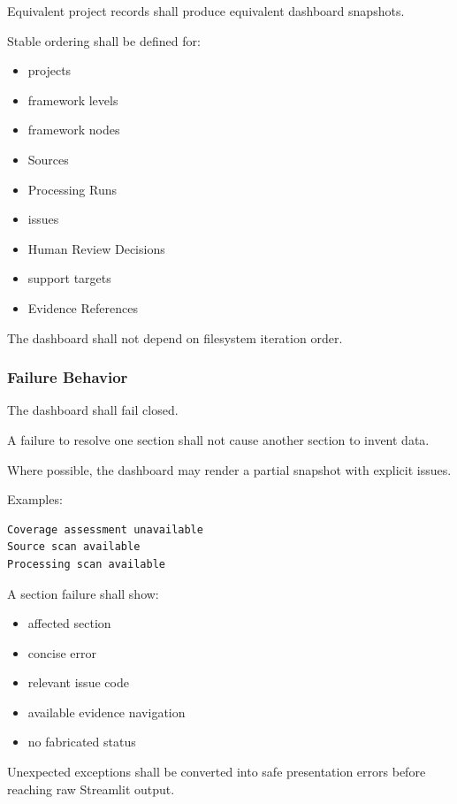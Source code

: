 Equivalent project records shall produce equivalent dashboard snapshots.

Stable ordering shall be defined for:

\begin{itemize}
\tightlist
\item
  projects
\item
  framework levels
\item
  framework nodes
\item
  Sources
\item
  Processing Runs
\item
  issues
\item
  Human Review Decisions
\item
  support targets
\item
  Evidence References
\end{itemize}

The dashboard shall not depend on filesystem iteration order.

\hypertarget{failure-behavior}{%
\subsubsection{Failure Behavior}\label{failure-behavior}}

The dashboard shall fail closed.

A failure to resolve one section shall not cause another section to invent data.

Where possible, the dashboard may render a partial snapshot with explicit issues.

Examples:

\begin{verbatim}
Coverage assessment unavailable
Source scan available
Processing scan available
\end{verbatim}

A section failure shall show:

\begin{itemize}
\tightlist
\item
  affected section
\item
  concise error
\item
  relevant issue code
\item
  available evidence navigation
\item
  no fabricated status
\end{itemize}

Unexpected exceptions shall be converted into safe presentation errors before reaching raw Streamlit output.

